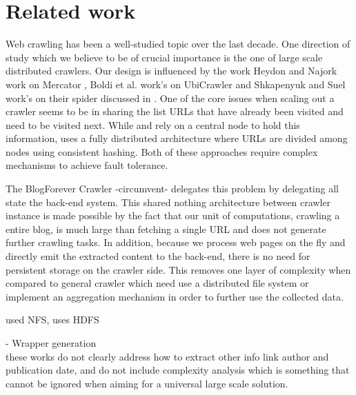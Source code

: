 \section{Related work}
\label{relatedwork}

Web crawling has been a well-studied topic over the last decade. One direction of study which we believe to be of crucial importance is the one of large scale distributed crawlers. Our design is influenced by the work Heydon and Najork work on Mercator \cite{heydon99mercator}, Boldi et al. work's on UbiCrawler \cite{boldi2003} and Shkapenyuk and Suel work's on their spider discussed in \cite{shkapenyuk2002}. One of the core issues when scaling out a crawler seems to be in sharing the list URLs that have already been visited and need to be visited next. While \cite{heydon99mercator} and \cite{shkapenyuk2002} rely on a central node to hold this information, \cite{boldi2003} uses a fully distributed architecture where URLs are divided among nodes using consistent hashing. Both of these approaches require complex mechanisms to achieve fault tolerance.

The BlogForever Crawler -circumvent- delegates this problem by delegating all state the back-end system. This shared nothing architecture between crawler instance is made possible by the fact that our unit of computations, crawling a entire blog, is much large than fetching a single URL and does not generate further crawling tasks. In addition, because we process web pages on the fly and directly emit the extracted content to the back-end, there is no need for persistent storage on the crawler side. This removes one layer of complexity when compared to general crawler which need use a distributed file system or implement an aggregation mechanism in order to further use the collected data.

\cite{shkapenyuk2002} used NFS, \cite{berger2011} uses HDFS

- Wrapper generation\\
these works do not clearly address how to extract other info link author and publication date, and do not include complexity analysis which is something that cannot be ignored when aiming for a universal large scale solution.




